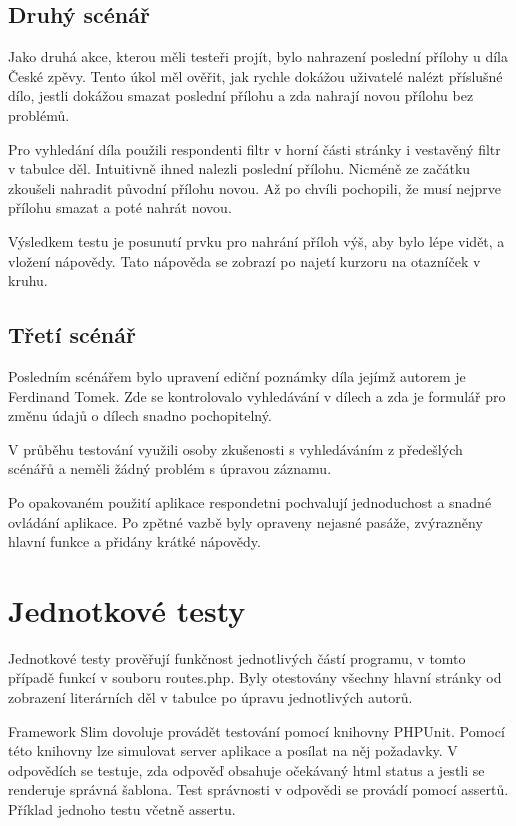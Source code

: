         \subsection{Druhý scénář}
            Jako druhá akce, kterou měli testeři projít, bylo nahrazení poslední přílohy u díla České zpěvy. Tento úkol měl ověřit, jak rychle dokážou uživatelé nalézt příslušné dílo, jestli dokážou smazat poslední přílohu a zda nahrají novou přílohu bez problémů.
            
            Pro vyhledání díla použili respondenti filtr v horní části stránky i vestavěný filtr v tabulce děl. Intuitivně ihned nalezli poslední přílohu. Nicméně ze začátku zkoušeli nahradit původní přílohu novou. Až po chvíli pochopili, že musí nejprve přílohu smazat a poté nahrát novou.

            Výsledkem testu je posunutí prvku pro nahrání příloh výš, aby bylo lépe vidět, a vložení nápovědy. Tato nápověda se zobrazí po najetí kurzoru na otazníček v kruhu.

        \subsection{Třetí scénář}
            Posledním scénářem bylo upravení ediční poznámky díla jejímž autorem je Ferdinand Tomek. Zde se kontrolovalo vyhledávání v dílech a zda je formulář pro změnu údajů o dílech snadno pochopitelný.
            
            V průběhu testování využili osoby zkušenosti s vyhledáváním z předešlých scénářů a neměli žádný problém s úpravou záznamu. 
            
            Po opakovaném použití aplikace respondetni pochvalují jednoduchost a snadné ovládání aplikace. Po zpětné vazbě byly opraveny nejasné pasáže, zvýrazněny hlavní funkce a přidány krátké nápovědy.

    \section{Jednotkové testy}
        Jednotkové testy prověřují funkčnost jednotlivých částí programu, v tomto případě funkcí v souboru routes.php. Byly otestovány všechny hlavní stránky od zobrazení literárních děl v tabulce po úpravu jednotlivých autorů.
        
        Framework Slim dovoluje provádět testování pomocí knihovny PHPUnit. Pomocí této knihovny lze simulovat server aplikace a posílat na něj požadavky. V odpovědích se testuje, zda odpověď obsahuje očekávaný html status a jestli se renderuje správná šablona. Test správnosti v odpovědi se provádí pomocí assertů. Příklad jednoho testu včetně assertu.
        
